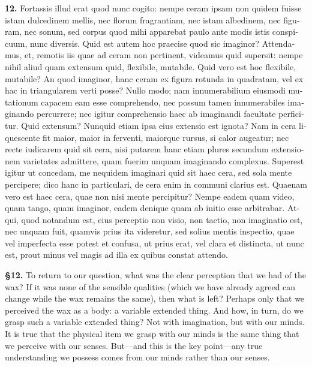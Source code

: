 \clearpage

\beginnumbering
\pstart
\begin{latin}
    \textenglish{\textbf{12.}} Fortassis illud erat quod nunc cogito: nempe ceram ipsam non quidem fuisse istam dulcedinem mellis, nec florum fragrantiam, nec istam albedinem, nec figuram, nec sonum, sed corpus quod mihi apparebat paulo ante modis istis conspicuum, nunc diversis. Quid est autem hoc praecise quod sic imaginor? Attendamus, et, remotis iis quae ad ceram non pertinent, videamus quid supersit: nempe nihil aliud quam extensum quid, flexibile, mutabile. Quid vero est hoc flexibile, mutabile? An quod imaginor, hanc ceram ex figura rotunda in quadratam, vel ex hac in triangularem verti posse? Nullo modo; nam innumerabilium eiusmodi mutationum capacem eam esse comprehendo, nec possum tamen innumerabiles imaginando percurrere; nec igitur comprehensio haec ab imaginandi facultate perficitur. Quid extensum? Nunquid etiam ipsa eius extensio est ignota? Nam in cera liquescente fit maior, maior in ferventi, maiorque rursus, si calor augeatur; nec recte iudicarem quid sit cera, nisi putarem hanc etiam plures secundum extensionem varietates admittere, quam fuerim unquam imaginando complexus. Superest igitur ut concedam, me nequidem imaginari quid sit haec cera, sed sola mente percipere; dico hanc in particulari, de cera enim in communi clarius est. Quaenam vero est haec cera, quae non nisi mente percipitur? Nempe eadem quam video, quam tango, quam imaginor, eadem denique quam ab initio esse arbitrabar. Atqui, quod notandum est, eius perceptio non visio, non tactio, non imaginatio est, nec unquam fuit, quamvis prius ita videretur, sed solius mentis inspectio, quae vel imperfecta esse potest et confusa, ut prius erat, vel clara et distincta, ut nunc est, prout minus vel magis ad illa ex quibus constat attendo.
\end{latin}
\pend
\endnumbering

\prenotes

\textbf{§12.} To return to our question, what was the clear perception that we had of the wax? If it was none of the sensible qualities (which we have already agreed can change while the wax remains the same), then what is left? Perhaps only that we perceived the wax as a body: a variable extended thing. And how, in turn, do we grasp such a variable extended thing? Not with imagination, but with our minds. It is true that the physical item we grasp with our minds is the same thing that we perceive with our senses. But---and this is the key point---any true understanding we possess comes from our minds rather than our senses.

